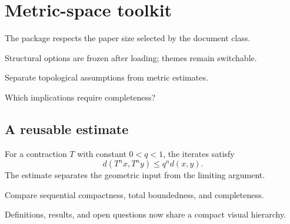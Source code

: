 \documentclass[11pt,letterpaper]{scrartcl}
\begin{document}
\SynapticMakeTitle
\section{Metric-space toolkit}
The package respects the paper size selected by the document class.
\begin{synlemma}
  Structural options are frozen after loading; themes remain switchable.
\end{synlemma}
\begin{synkeyidea}
  Separate topological assumptions from metric estimates.
\end{synkeyidea}
\begin{synquestion}
  Which implications require completeness?
\end{synquestion}
\subsection{A reusable estimate}
For a contraction $T$ with constant $0<q<1$, the iterates satisfy
\[
  d(T^n x,T^n y)\leq q^n d(x,y).
\]
The estimate separates the geometric input from the limiting argument.
\begin{syntodo}
  Compare sequential compactness, total boundedness, and completeness.
\end{syntodo}
\begin{synsummary}
  Definitions, results, and open questions now share a compact visual hierarchy.
\end{synsummary}
\end{document}
